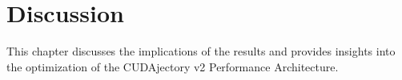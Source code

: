 \chapter{Discussion}
This chapter discusses the implications of the results and provides insights into the optimization of the CUDAjectory v2 Performance Architecture.


